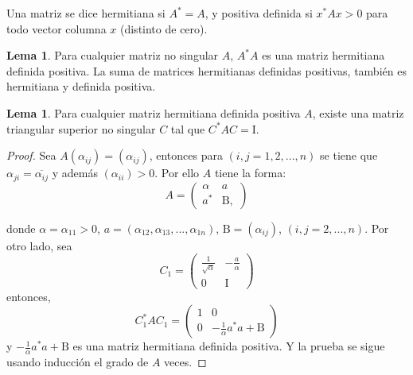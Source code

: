 \documentclass[12pt]{book}
\theoremstyle{definition}
\newtheorem{lemma}[theorem]{Lema}
\newcounter{in}
\newcounter{ini}
\begin{document}
Una matriz se dice hermitiana si $A^{*}=A$, y positiva definida si
$x^{*}Ax>0$ para todo vector columna $x$ (distinto de cero).

\begin{lemma}
  \label{l2_1}
  Para cualquier matriz no singular $A$, $A^{*}A$ es una matriz
  hermitiana definida positiva. La suma de matrices hermitianas
  definidas positivas, también es hermitiana y definida positiva.

\end{lemma}

\begin{lemma}
  \label{l2_2}
   Para cualquier matriz hermitiana definida positiva
$A$, existe una matriz triangular superior no singular $C$ tal que
$C^{*}AC=\mathrm{I}$.
\end{lemma}

\begin{proof}
  Sea $A\left(\alpha_{ij}\right)=(\alpha_{ij})$, entonces para
  $\left(i,j=1,2,...,n\right)$ se tiene que
  $\alpha_{ji}=\overline{\alpha_{ij}}$ y además
  $\left(\alpha_{ii}\right)>0$. Por ello $A$ tiene la forma:
  \begin{equation}
    \label{eq:2}
     A=
     \begin{pmatrix}
    \alpha & a \\ 
    a^{*} & \mathrm{B},
  \end{pmatrix}
  \end{equation} 

  donde $\alpha=\alpha_{11}>0$,
  $ a= \left(\alpha_{12},\alpha_{13},...,\alpha_{1n} \right) $,
  $ \mathrm{B}=\left(\alpha_{ij}\right)$,
  $ \left(i,j=2,...,n\right) $. Por otro lado, sea
\begin{equation}
  \label{eq:3}
  C_{1}=
  \begin{pmatrix}
    \frac{1}{\sqrt{\alpha}} & -\frac{a}{\alpha} \\ 
    0 & \mathrm{I}
  \end{pmatrix}
\end{equation}
entonces, 
\begin{equation}
   \label{eq:4}
  C_{1}^{*}AC_{1} =
  \begin{pmatrix}
    1 & 0 \\ 
    0 & -\frac{1}{\alpha}a^{*}a+\mathrm{B}
  \end{pmatrix}
\end{equation}  
y $-\frac{1}{\alpha}a^{*}a+\mathrm{B}$ es una matriz hermitiana
definida positiva. Y la prueba se sigue usando inducción el grado de
$A$ veces.
\end{proof}
\end{document}
